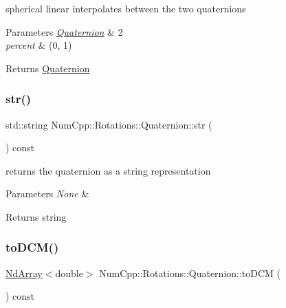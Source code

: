 spherical linear interpolates between the two quaternions


\begin{DoxyParams}{Parameters}
{\em \mbox{\hyperlink{class_num_cpp_1_1_rotations_1_1_quaternion}{Quaternion}}} & 2 \\
\hline
{\em percent} & (0, 1) \\
\hline
\end{DoxyParams}
\begin{DoxyReturn}{Returns}
\mbox{\hyperlink{class_num_cpp_1_1_rotations_1_1_quaternion}{Quaternion}} 
\end{DoxyReturn}
\mbox{\label{class_num_cpp_1_1_rotations_1_1_quaternion_a363faa78c121cf2b78784e7b2e49e998}} 
\subsubsection{\texorpdfstring{str()}{str()}}
{\footnotesize\ttfamily std\+::string Num\+Cpp\+::\+Rotations\+::\+Quaternion\+::str (\begin{DoxyParamCaption}{ }\end{DoxyParamCaption}) const\hspace{0.3cm}{\ttfamily [inline]}}

returns the quaternion as a string representation


\begin{DoxyParams}{Parameters}
{\em None} & \\
\hline
\end{DoxyParams}
\begin{DoxyReturn}{Returns}
string 
\end{DoxyReturn}
\mbox{\label{class_num_cpp_1_1_rotations_1_1_quaternion_acb7afe46d4731a28053b68b3fdeec583}} 
\subsubsection{\texorpdfstring{to\+D\+C\+M()}{toDCM()}}
{\footnotesize\ttfamily \mbox{\hyperlink{class_num_cpp_1_1_nd_array}{Nd\+Array}}$<$double$>$ Num\+Cpp\+::\+Rotations\+::\+Quaternion\+::to\+D\+CM (\begin{DoxyParamCaption}{ }\end{DoxyParamCaption}) const\hspace{0.3cm}{\ttfamily [inline]}}

